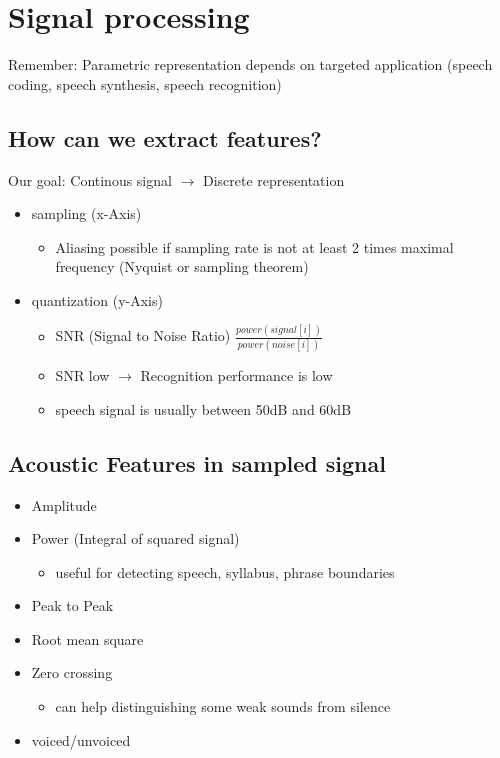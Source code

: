 \documentclass[11pt]{article}
\begin{document}
\newpage

\section{Signal processing}
Remember: Parametric representation depends on targeted application (speech coding, speech synthesis, speech recognition)
\subsection{How can we extract features?}

Our goal: Continous signal $\rightarrow$ Discrete representation

\begin{itemize}
\item sampling (x-Axis)
\begin{itemize}
\item Aliasing possible if sampling rate is not at least 2 times maximal frequency (Nyquist or sampling theorem)
\end{itemize}

\item quantization (y-Axis)
\begin{itemize}
\item SNR (Signal to Noise Ratio) $\frac{power\left(signal\left[i\right]\right)}{power\left(noise\left[i\right]\right)}$
\item SNR low $\rightarrow$ Recognition performance is low
\item speech signal is usually between 50dB and 60dB
\end{itemize}

\end{itemize}

\subsection{Acoustic Features in sampled signal}
\begin{itemize}
\item Amplitude
\item Power (Integral of squared signal)
\begin{itemize}
\item useful for detecting speech, syllabus, phrase boundaries
\end{itemize}
\item Peak to Peak
\item Root mean square
\item Zero crossing
\begin{itemize}
\item can help distinguishing some weak sounds from silence
\end{itemize}
\item voiced/unvoiced


\end{itemize}
\end{document}
